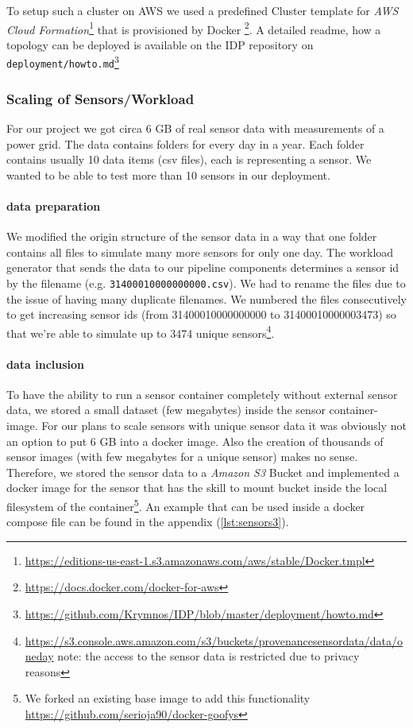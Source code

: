 To setup such a cluster on AWS we used a predefined Cluster template for \emph{AWS Cloud Formation}\footnote{\url{https://editions-us-east-1.s3.amazonaws.com/aws/stable/Docker.tmpl}} that is provisioned by Docker \footnote{\url{https://docs.docker.com/docker-for-aws}}. A detailed readme, how a topology can be deployed is available on the IDP repository on \texttt{deployment/howto.md}\footnote{\url{https://github.com/Krymnos/IDP/blob/master/deployment/howto.md}}

\subsubsection*{Scaling of Sensors/Workload}
For our project we got circa 6 GB of real sensor data with measurements of a power grid. The data contains folders for every day in a year. Each folder contains usually 10 data items (csv files), each is representing a sensor. We wanted to be able to test more than 10 sensors in our deployment.

\paragraph*{data preparation}
We modified the origin structure of the sensor data in a way that one folder contains all files to simulate many more sensors for only one day.
The workload generator that sends the data to our pipeline components determines a sensor id by the filename (e.g. \texttt{31400010000000000.csv}). We had to rename the files due to the issue of having many duplicate filenames. We numbered the files consecutively to get increasing sensor ids (from 31400010000000000 to 31400010000003473) so that we're able to simulate up to 3474 unique sensors\footnote{\url{https://s3.console.aws.amazon.com/s3/buckets/provenancesensordata/data/oneday} note: the access to the sensor data is restricted due to privacy reasons}.

\paragraph*{data inclusion}
To have the ability to run a sensor container completely without external sensor data, we stored a small dataset (few megabytes) inside the sensor container-image.
For our plans to scale sensors with unique sensor data it was obviously not an option to put 6 GB into a docker image. Also the creation of thousands of sensor images (with few megabytes for a unique sensor) makes no sense.
Therefore, we stored the sensor data to a \emph{Amazon S3} Bucket and implemented a docker image for the sensor that has the skill to mount bucket inside the local filesystem of the container\footnote{We forked an existing base image to add this functionality \url{https://github.com/serioja90/docker-goofys}}. An example that can be used inside a docker compose file can be found in the appendix (\ref{lst:sensors3}).

